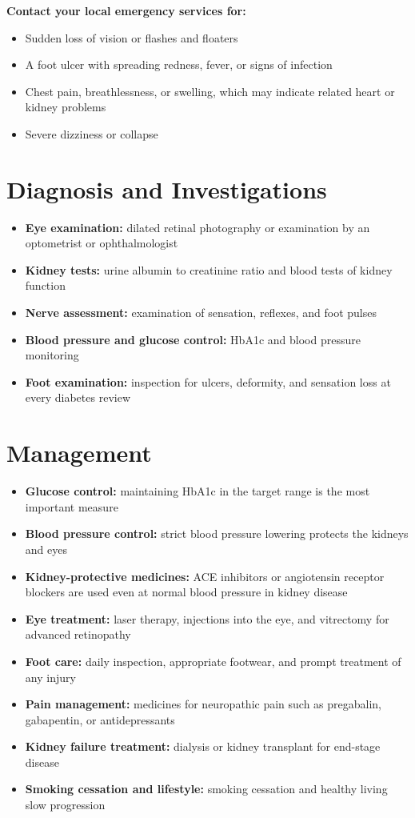 \textbf{Contact your local emergency services for:}
\begin{itemize}
    \item Sudden loss of vision or flashes and floaters
    \item A foot ulcer with spreading redness, fever, or signs of infection
    \item Chest pain, breathlessness, or swelling, which may indicate related heart or kidney problems
    \item Severe dizziness or collapse
\end{itemize}

\section*{Diagnosis and Investigations}
\begin{itemize}
    \item \textbf{Eye examination:} dilated retinal photography or examination by an optometrist or ophthalmologist
    \item \textbf{Kidney tests:} urine albumin to creatinine ratio and blood tests of kidney function
    \item \textbf{Nerve assessment:} examination of sensation, reflexes, and foot pulses
    \item \textbf{Blood pressure and glucose control:} HbA1c and blood pressure monitoring
    \item \textbf{Foot examination:} inspection for ulcers, deformity, and sensation loss at every diabetes review
\end{itemize}

\section*{Management}
\begin{itemize}
    \item \textbf{Glucose control:} maintaining HbA1c in the target range is the most important measure
    \item \textbf{Blood pressure control:} strict blood pressure lowering protects the kidneys and eyes
    \item \textbf{Kidney-protective medicines:} ACE inhibitors or angiotensin receptor blockers are used even at normal blood pressure in kidney disease
    \item \textbf{Eye treatment:} laser therapy, injections into the eye, and vitrectomy for advanced retinopathy
    \item \textbf{Foot care:} daily inspection, appropriate footwear, and prompt treatment of any injury
    \item \textbf{Pain management:} medicines for neuropathic pain such as pregabalin, gabapentin, or antidepressants
    \item \textbf{Kidney failure treatment:} dialysis or kidney transplant for end-stage disease
    \item \textbf{Smoking cessation and lifestyle:} smoking cessation and healthy living slow progression
\end{itemize}

